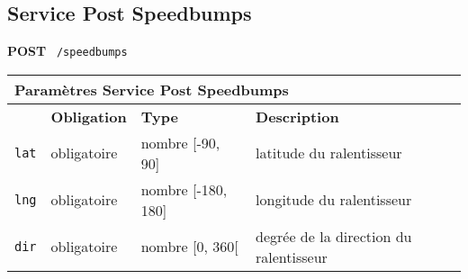\subsection{Service Post Speedbumps}
\label{appendix:sprint1-speedbumps-post-doc}

\textbf{POST} \ \texttt{/speedbumps}

\begin{table}[H]
    \centering
    \begin{tabularx}{\textwidth}{@{}p{2cm} p{2cm} p{3.5cm} p{6cm}@{}}
        \multicolumn{4}{X}{\textbf{Paramètres Service Post Speedbumps}} \\
        \toprule
        \rowcolor{gray!20}
        \multicolumn{1}{l}{\textbf{Élément}} &
        \multicolumn{1}{l}{\textbf{Obligation}} &
        \multicolumn{1}{l}{\textbf{Type}} &
        \multicolumn{1}{l}{\textbf{Description}} \\
        \midrule
        \verb|lat| & obligatoire & nombre [-90, 90] & latitude du ralentisseur \\
        \verb|lng| & obligatoire & nombre [-180, 180] & longitude du ralentisseur \\
        \verb|dir| & obligatoire & nombre [0, 360[ & degrée de la direction du ralentisseur \\
    \end{tabularx}
\end{table}
